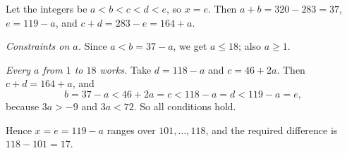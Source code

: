 Let the integers be \(a<b<c<d<e\), so \(x=e\). Then \(a+b=320-283=37\), \(e=119-a\), and \(c+d=283-e=164+a\).

\emph{Constraints on \(a\).} Since \(a<b=37-a\), we get \(a\le18\); also \(a\ge1\).

\emph{Every \(a\) from \(1\) to \(18\) works.} Take \(d=118-a\) and \(c=46+2a\). Then \(c+d=164+a\), and
\[
b=37-a<46+2a=c<118-a=d<119-a=e,
\]
because \(3a>-9\) and \(3a<72\). So all conditions hold.

Hence \(x=e=119-a\) ranges over \(101,\dots,118\), and the required difference is \(118-101=\boxed{17}\).
